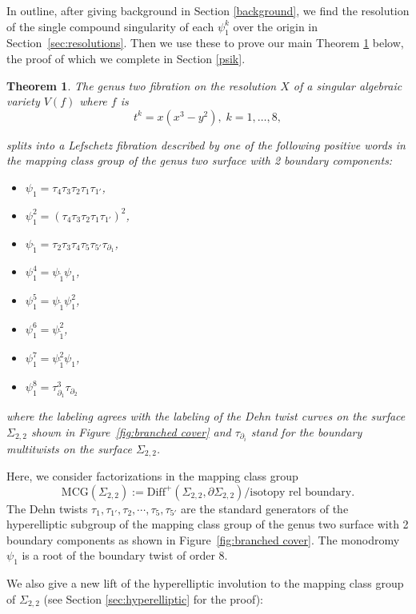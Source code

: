 \documentclass[11pt,letterpaper,reqno]{amsart}
\newtheorem{theorem}{Theorem}[section]
\theoremstyle{remark}
\def \bdry {\partial}
\begin{document}
In outline, after giving background in Section \ref{background}, we find the resolution of the single compound singularity of each $\psi_1^k$ over the origin in Section~\ref{sec:resolutions}. Then we use these to prove our main Theorem \ref{thm:main2} below, the proof of which we complete in Section \ref{psik}.

\begin{theorem} \label{thm:main2}
The genus two fibration on the resolution $X$ of a singular algebraic variety $V(f)$ where $f$ is 
\[t^k = x(x^3-y^2), \; k = 1,\dots, 8,\]

splits into a Lefschetz fibration described by one of the following positive words in the mapping class group of the genus two surface with 2 boundary components:

\begin{itemize}
\item $\psi_1 = \tau_4 \tau_3 \tau_2 \tau_1 \tau_{1'}$, 
\item $\psi_1^2 = (\tau_4 \tau_3 \tau_2 \tau_1 \tau_{1'})^2$,
\item $\psi_{\tilde{1}} = \tau_2 \tau_3 \tau_4 \tau_5 \tau_{5'} \tau_{\partial_1}$,  
\item $\psi_1^4=\psi_{\tilde{1}} \psi_{{1}}$, 
\item $\psi_1^5= \psi_{\tilde{1}} \psi_{{1}}^2$, 
\item $\psi_1^6 = \psi_{\tilde{1}}^2$, 
\item $\psi_1^7=\psi_{\tilde{1}}^2\psi_{{1}}$, 
\item $\psi_1^8=\tau_{\partial_1}^3\tau_{\partial_2}$
\end{itemize} 
where the labeling agrees with the labeling of the Dehn twist curves on the surface $\Sigma_{2,2}$ shown in Figure~\ref{fig:branched cover} and $\tau_{\bdry_{i}}$ stand for the boundary multitwists on the surface $\Sigma_{2,2}$.
\end{theorem}

Here, we consider factorizations in the mapping class group $$\mathrm{MCG}(\Sigma_{2,2}) := \mathrm{Diff}^+(\Sigma_{2,2}, \bdry  \Sigma_{2,2})/\text{isotopy rel boundary}.$$ The Dehn twists $\tau_1, \tau_{1'}, \tau_2, \cdots, \tau_5, \tau_{5'}$ are the standard generators of the hyperelliptic subgroup of the mapping class group of the genus two surface with 2 boundary components as shown in Figure~\ref{fig:branched cover}. The monodromy $\psi_1$ is a root of the boundary twist of order $8$.

We also give a new lift of the hyperelliptic involution to the mapping class group of $\Sigma_{2,2}$ (see Section \ref{sec:hyperelliptic} for the proof):
\end{document}
